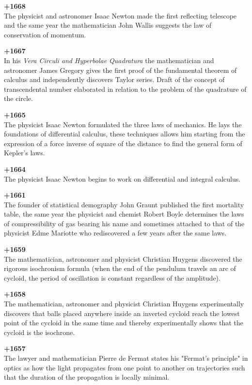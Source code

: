 \textbf{+1668}\\
The physicist and astronomer Isaac Newton made the first reflecting telescope and the same year the mathematician John Wallis suggests the law of conservation of momentum.

\textbf{+1667}\\
In his \textit{Vera Circuli and Hyperbolae Quadratura} the mathematician and astronomer James Gregory gives the first proof of the fundamental theorem of calculus and independently discovers Taylor series. Draft of the concept of transcendental number elaborated in relation to the problem of the quadrature of the circle.

\textbf{+1665}\\
The physicist Isaac Newton formulated the three laws of mechanics. He lays the foundations of differential calculus, these techniques allows him starting from the expression of a force inverse of square of the distance to find the general form of Kepler's laws.

\textbf{+1664}\\
The physicist Isaac Newton begins to work on differential and integral calculus.

\textbf{+1661}\\
The founder of statistical demography John Graunt published the first mortality table, the same year the physicist and chemist Robert Boyle determines the laws of compressibility of gas bearing his name and sometimes attached to that of the physicist Edme Mariotte who rediscovered a few years after the same laws.

\textbf{+1659}\\
The mathematician, astronomer and physicist Christian Huygens discovered the rigorous isochronism formula (when the end of the pendulum travels an arc of cycloid, the period of oscillation is constant regardless of the amplitude).

\textbf{+1658}\\
The mathematician, astronomer and physicist Christian Huygens experimentally discovers that balls placed anywhere inside an inverted cycloid reach the lowest point of the cycloid in the same time and thereby experimentally shows that the cycloid is the isochrone.

\textbf{+1657}\\
The lawyer and mathematician Pierre de Fermat states his "Fermat's principle" in optics as how the light propagates from one point to another on trajectories such that the duration of the propagation is locally minimal.


